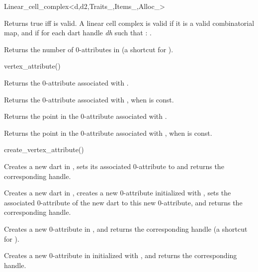 \begin{ccRefClass}{Linear_cell_complex<d,d2,Traits_,Items_,Alloc_>}

         {Returns true iff  is valid.}
A linear cell complex  is valid  
if it is a valid combinatorial map, and if for each dart handle \emph{dh} such that 
\myin{}: .


{Returns the number of 0-attributes in 
       (a shortcut for ).}
 
{vertex_attribute()}{}

{Returns the 0-attribute associated with .}

{Returns the 0-attribute associated with , when  is const.}

{Returns the point in the 0-attribute associated with .}

{Returns the point in the 0-attribute associated with , 
 when  is const.}

{create_vertex_attribute()}{}

   {Creates a new dart in , sets its associated 0-attribute
     to  and returns the corresponding handle.
   }

{Creates a new dart in , creates a new 0-attribute 
  initialized with , sets the associated 0-attribute
  of the new dart to this new 0-attribute, 
  and returns the corresponding handle.}

{Creates a new 0-attribute in , and returns the corresponding handle
  (a shortcut for ).}

{Creates a new 0-attribute in  initialized with ,
  and returns the corresponding handle.}


\end{ccRefClass}
